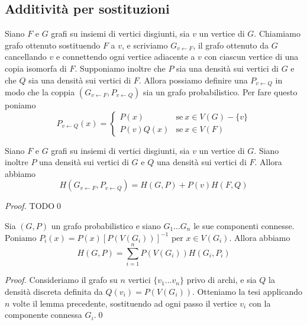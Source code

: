 \subsection{Additività per sostituzioni}
Siano \(F\) e \(G\) grafi su insiemi di vertici disgiunti, sia \(v\) un vertice di \(G\). Chiamiamo grafo ottenuto sostituendo \(F\) a \(v\), e scriviamo \(G_{v\leftarrow F}\), il grafo ottenuto da \(G\) cancellando \(v\) e connettendo ogni vertice adiacente a \(v\) con ciascun vertice di una copia isomorfa di \(F\). Supponiamo inoltre che \(P\) sia una densità sui vertici di \(G\) e che \(Q\) sia una densità sui vertici di \(F\). Allora possiamo definire una \(P_{v\leftarrow Q}\) in modo che la coppia \((G_{v\leftarrow F}, P_{v\leftarrow Q})\) sia un grafo probabilistico. Per fare questo poniamo
\[P_{v\leftarrow Q}(x)= 
\begin{cases}
	P(x) & \text{se}\ x\in V(G)-\{v\}\\
	P(v)Q(x) & \text{se}\ x\in V(F) 
\end{cases}
\]
\begin{lemma}
	Siano \(F\) e \(G\) grafi su insiemi di vertici disgiunti, sia \(v\) un vertice di \(G\). Siano inoltre \(P\) una densità sui vertici di \(G\) e \(Q\) una densità sui vertici di \(F\). Allora abbiamo
	\[H(G_{v\leftarrow F}, P_{v\leftarrow Q})=H(G,P)+P(v)H(F,Q)\]
\end{lemma}
\begin{proof}
	TODO\qed 
\end{proof}
\begin{corollary}
	Sia \((G,P)\) un grafo probabilistico e siano \(G_{1}\dots G_{n}\) le sue componenti connesse. Poniamo \(P_i(x)=P(x)[P(V(G_i))]^{-1}\) per \(x\in V(G_i)\). Allora abbiamo
	\[H(G,P)=\sum_{i=1}^n P(V(G_i))H(G_i,P_i)\]
\end{corollary}
\begin{proof}
	Consideriamo il grafo su \(n\) vertici \(\{v_{1}\dots v_{n}\}\) privo di archi, e sia \(Q\) la densità discreta definita da \(Q(v_{i}) = P(V(G_i))\). Otteniamo la tesi applicando \(n\) volte il lemma precedente, sostituendo ad ogni passo il vertice \(v_i\) con la componente connessa \(G_{i}\).\qed 
\end{proof}

